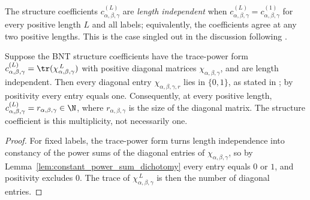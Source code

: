\begin{definition}%
    \label{def:mpdo_bnt_label_length_independent}
    \leanok
    The structure coefficients $c^{(L)}_{\alpha,\beta,\gamma}$ are
    \emph{length independent} when
    $c^{(L)}_{\alpha,\beta,\gamma} = c^{(1)}_{\alpha,\beta,\gamma}$ for
    every positive length $L$ and all labels; equivalently, the
    coefficients agree at any two positive lengths. This is the case
    singled out in the discussion following
    \cite[Theorem~4.14]{Cirac2016MPDO_arXiv}.
\end{definition}

\begin{lemma}%
    \label{thm:mpdo_bnt_label_length_independent_natural}
    \leanok
    Suppose the BNT structure coefficients have the trace-power form
    $c^{(L)}_{\alpha,\beta,\gamma}
        = \tr(\chi_{\alpha,\beta,\gamma}^{\,L})$
    with positive diagonal matrices $\chi_{\alpha,\beta,\gamma}$, and are
    length independent. Then every diagonal entry
    $\chi_{\alpha,\beta,\gamma,r}$ lies in $\{0,1\}$, as stated in
    \cite[Section~4.5]{Cirac2016MPDO_arXiv}; by positivity every entry
    equals one. Consequently, at every positive length,
    $c^{(L)}_{\alpha,\beta,\gamma}
        = r_{\alpha,\beta,\gamma} \in \N$, where
    $r_{\alpha,\beta,\gamma}$ is the size of the diagonal matrix.
    The structure coefficient is this multiplicity, not necessarily one.
\end{lemma}
\begin{proof}\leanok
    For fixed labels, the trace-power form turns length independence into
    constancy of the power sums of the diagonal entries of
    $\chi_{\alpha,\beta,\gamma}$, so by
    Lemma~\ref{lem:constant_power_sum_dichotomy} every entry equals $0$ or
    $1$, and positivity excludes $0$. The trace of
    $\chi_{\alpha,\beta,\gamma}^{\,L}$ is then the number of diagonal
    entries.
\end{proof}


